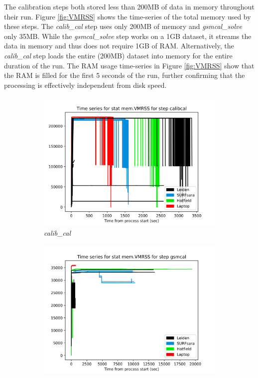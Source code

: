 The calibration steps both stored less than 200MB of data in memory throughout their run. Figure \ref{fig:VMRSS} shows the time-series of the total memory used by these steps. The \textit{calib\_cal} step uses only 200MB of memory and \textit{gsmcal\_solve} only 35MB. While the \textit{gsmcal\_solve} step works on a 1GB dataset, it streams the data in memory and thus does not require 1GB of RAM. Alternatively, the \textit{calib\_cal} step loads the entire (200MB) dataset into memory for the entire duration of the run. The RAM usage time-series in Figure \ref{fig:VMRSS} show that the RAM is filled for the first 5 seconds of the run, further confirming that the processing is effectively independent from disk speed. 


\begin{figure}
  \centering
   \begin{subfigure}{.45\textwidth}
    \includegraphics[width=\textwidth]{ch4/figures/fig10/calibcal_vmrss.png}
      \caption{\textit{calib\_cal} }
	\label{calib_cal_VMRSS}
 \end{subfigure}%
 \begin{subfigure}{.45\textwidth}
    \includegraphics[width=\textwidth]{ch4/figures/fig10/gsmcal_vmrss.png}

\end{subfigure}
\end{figure}
